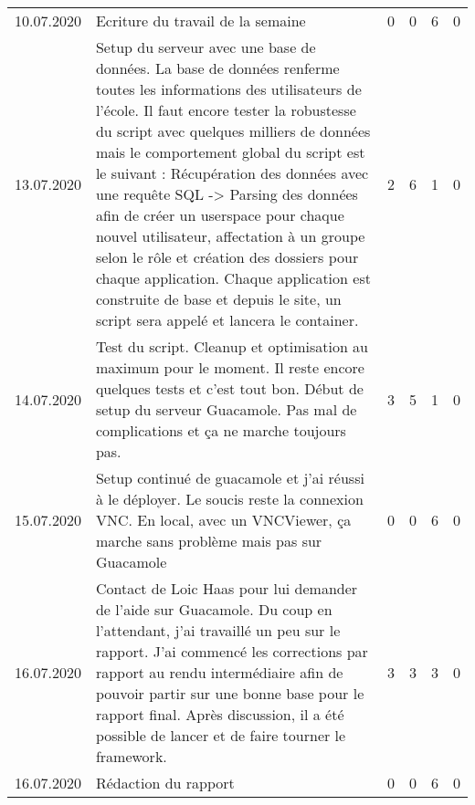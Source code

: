 \begin{landscape}
\begin{longtable}[c]{lp{10cm}rrrr}
	10.07.2020
	& Ecriture du travail de la semaine 
	& 0 %
	& 0 %
	& 6 %
	& 0\\ %
	
	13.07.2020
	& Setup du serveur avec une base de données. La base de données renferme toutes les informations des utilisateurs de l'école. Il faut encore tester la robustesse du script avec quelques milliers de données mais le comportement global du script est le suivant : Récupération des données avec une requête SQL -> Parsing des données afin de créer un userspace pour chaque nouvel utilisateur, affectation à un groupe selon le rôle et création des dossiers pour chaque application. Chaque application est construite de base et depuis le site, un script sera appelé et lancera le container.
	& 2 %
	& 6 %
	& 1 %
	& 0\\ %
	
	14.07.2020
	& Test du script. Cleanup et optimisation au maximum pour le moment. Il reste encore quelques tests et c'est tout bon. Début de setup du serveur Guacamole. Pas mal de complications et ça ne marche toujours pas.
	& 3 %
	& 5 %
	& 1 %
	& 0\\ %
	
	15.07.2020
	& Setup continué de guacamole et j'ai réussi à le déployer. Le soucis reste la connexion VNC. En local, avec un VNCViewer, ça marche sans problème mais pas sur Guacamole
	& 0 %
	& 0 %
	& 6 %
	& 0\\ %
	
	16.07.2020
	& Contact de Loic Haas pour lui demander de l'aide sur Guacamole. Du coup en l'attendant, j'ai travaillé un peu sur le rapport. J'ai commencé les corrections par rapport au rendu intermédiaire afin de pouvoir partir sur une bonne base pour le rapport final. Après discussion, il a été possible de lancer et de faire tourner le framework.
	& 3 %
	& 3 %
	& 3 %
	& 0\\ %
	
	16.07.2020
	& Rédaction du rapport
	& 0 %
	& 0 %
	& 6 %
	& 0\\ %
	
\end{longtable}


\end{landscape}
